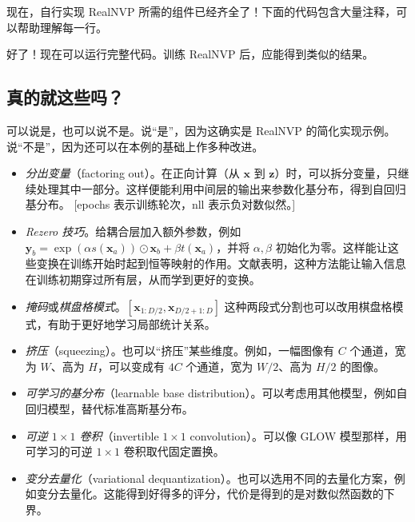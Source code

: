 现在，自行实现 RealNVP 所需的组件已经齐全了！下面的代码包含大量注释，可以帮助理解每一行。




好了！现在可以运行完整代码。训练 RealNVP 后，应能得到类似的结果。

\subsection{真的就这些吗？}

可以说是，也可以说不是。说“是”，因为这确实是 RealNVP 的简化实现示例。说“不是”，因为还可以在本例的基础上作多种改进。

\begin{itemize}
\item \emph{分出变量}（factoring out）。在正向计算（从 $\mathbf{x}$ 到 $\mathbf{z}$）时，可以拆分变量，只继续处理其中一部分。这样便能利用中间层的输出来参数化基分布，得到自回归基分布。
[epochs 表示训练轮次，nll 表示负对数似然。]

\item \emph{Rezero 技巧}。给耦合层加入额外参数，例如 $\mathbf{y}_b=\exp(\alpha s(\mathbf{x}_a))\odot\mathbf{x}_b+\beta t(\mathbf{x}_a)$，并将 $\alpha,\beta$ 初始化为零。这样能让这些变换在训练开始时起到恒等映射的作用。文献表明，这种方法能让输入信息在训练初期穿过所有层，从而学到更好的变换。
\item \emph{掩码}或\emph{棋盘格模式}。$[\mathbf{x}_{1:D/2},\mathbf{x}_{D/2+1:D}]$ 这种两段式分割也可以改用棋盘格模式，有助于更好地学习局部统计关系。
\item \emph{挤压}（squeezing）。也可以“挤压”某些维度。例如，一幅图像有 $C$ 个通道，宽为 $W$、高为 $H$，可以变成有 $4C$ 个通道，宽为 $W/2$、高为 $H/2$ 的图像。
\item \emph{可学习的基分布}（learnable base distribution）。可以考虑用其他模型，例如自回归模型，替代标准高斯基分布。
\item \emph{可逆 $1\times1$ 卷积}（invertible $1\times1$ convolution）。可以像 GLOW 模型那样，用可学习的可逆 $1\times1$ 卷积取代固定置换。
\item \emph{变分去量化}（variational dequantization）。也可以选用不同的去量化方案，例如变分去量化。这能得到好得多的评分，代价是得到的是对数似然函数的下界。
\end{itemize}

